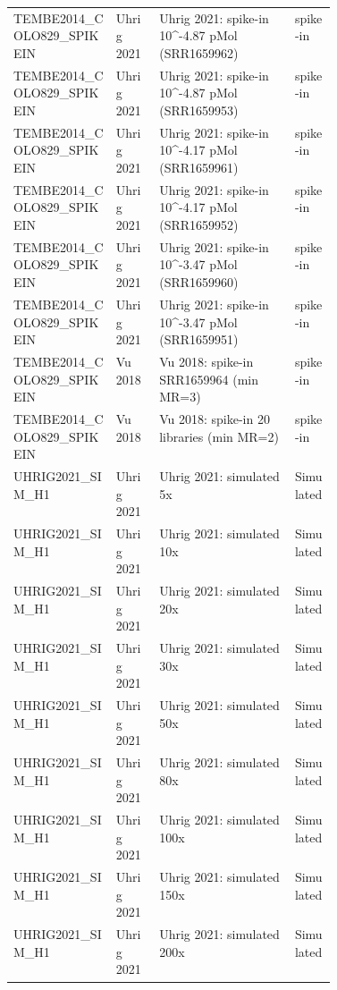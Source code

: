 {\begin{longtable}{llp{0.42\linewidth}l}
TEMBE2014\_COLO829\_SPIKEIN & Uhrig 2021 & Uhrig 2021: spike-in 10\textasciicircum{}-4.87 pMol (SRR1659962) & spike-in \\
TEMBE2014\_COLO829\_SPIKEIN & Uhrig 2021 & Uhrig 2021: spike-in 10\textasciicircum{}-4.87 pMol (SRR1659953) & spike-in \\
TEMBE2014\_COLO829\_SPIKEIN & Uhrig 2021 & Uhrig 2021: spike-in 10\textasciicircum{}-4.17 pMol (SRR1659961) & spike-in \\
TEMBE2014\_COLO829\_SPIKEIN & Uhrig 2021 & Uhrig 2021: spike-in 10\textasciicircum{}-4.17 pMol (SRR1659952) & spike-in \\
TEMBE2014\_COLO829\_SPIKEIN & Uhrig 2021 & Uhrig 2021: spike-in 10\textasciicircum{}-3.47 pMol (SRR1659960) & spike-in \\
TEMBE2014\_COLO829\_SPIKEIN & Uhrig 2021 & Uhrig 2021: spike-in 10\textasciicircum{}-3.47 pMol (SRR1659951) & spike-in \\
TEMBE2014\_COLO829\_SPIKEIN & Vu 2018 & Vu 2018: spike-in SRR1659964 (min MR=3) & spike-in \\
TEMBE2014\_COLO829\_SPIKEIN & Vu 2018 & Vu 2018: spike-in 20 libraries (min MR=2) & spike-in \\
UHRIG2021\_SIM\_H1 & Uhrig 2021 & Uhrig 2021: simulated 5x & Simulated \\
UHRIG2021\_SIM\_H1 & Uhrig 2021 & Uhrig 2021: simulated 10x & Simulated \\
UHRIG2021\_SIM\_H1 & Uhrig 2021 & Uhrig 2021: simulated 20x & Simulated \\
UHRIG2021\_SIM\_H1 & Uhrig 2021 & Uhrig 2021: simulated 30x & Simulated \\
UHRIG2021\_SIM\_H1 & Uhrig 2021 & Uhrig 2021: simulated 50x & Simulated \\
UHRIG2021\_SIM\_H1 & Uhrig 2021 & Uhrig 2021: simulated 80x & Simulated \\
UHRIG2021\_SIM\_H1 & Uhrig 2021 & Uhrig 2021: simulated 100x & Simulated \\
UHRIG2021\_SIM\_H1 & Uhrig 2021 & Uhrig 2021: simulated 150x & Simulated \\
UHRIG2021\_SIM\_H1 & Uhrig 2021 & Uhrig 2021: simulated 200x & Simulated \\
\bottomrule
\end{longtable}
}
